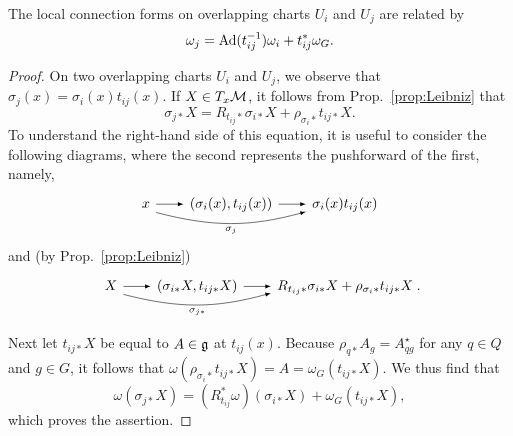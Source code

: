 \documentclass[
final,
11pt,
a4paper,
DIV=11,
headinclude=true,
footinclude=false,
bibliography=totoc,
twoside=true,  %
BCOR=5mm
]{scrbook}
\begin{document}
\begin{proposition}
\label{prop:trafo_local_Ehr_conn}
The local connection forms on overlapping charts $U_i$ and $U_j$ 
are related by
\begin{equation}
\label{eq:trafo_Ehr_conn}
  \omega_j = \operatorname{Ad}(t_{ij}^{-1}) \omega_i + t_{ij}^*\omega_G.
\end{equation}
\end{proposition}
\begin{proof}
On two overlapping charts $U_i$ and $U_j$, we observe that 
$\sigma_j(x) = \sigma_i(x) t_{ij}(x)$. If $X \in T_x\mathcal{M}$, it 
follows from Prop.~\ref{prop:Leibniz} that
\begin{equation*}
  \sigma_{j*}X = R_{t_{ij}*}\sigma_{i*}X + 
  \rho_{\sigma_i*}t_{ij*}X.
\end{equation*}
To understand the right-hand side of this equation, it is useful 
to consider the following diagrams, where the second represents 
the pushforward of the first, namely,
\begin{equation*}
\begin{tikzcd}[
  column sep=0.7cm,
  every arrow/.append style={-latex}
  ]
  x \arrow[r]
    \arrow[rr,
        "\sigma_j"',
        bend right=15,
        start anchor={[yshift=-4pt]},
        end anchor={[yshift=2pt]}]
  & (\sigma_i(x), t_{ij}(x)) \arrow[r]
  & \sigma_i(x) t_{ij}(x)
\end{tikzcd}
\end{equation*}
and (by Prop.~\ref{prop:Leibniz})
\begin{equation*}
\begin{tikzcd}[
  column sep=0.7cm,
  every arrow/.append style={-latex}
  ]
  X \arrow[r]
    \arrow[rr,
        "\sigma_{j*}"',
        bend right=15,
        start anchor={[yshift=-2.5pt]},
        end anchor={[yshift=+5pt]south west}]
  & (\sigma_{i*}X, t_{ij*}X) \arrow[r]
  & R_{t_{ij}*}\sigma_{i*}X + \rho_{\sigma_i*}t_{ij*}X
\end{tikzcd}
\!.
\end{equation*}

Next let $t_{ij*}X$ be equal to $A \in \mathfrak{g}$ at $t_{ij}(x)$.  
Because $\rho_{q*}A_g = A_{qg}^\star$ for any $q \in Q$ and $g 
\in G$, it follows that $\omega(\rho_{\sigma_i*} t_{ij*}X) 
= A = \omega_G(t_{ij*}X)$.  We thus find that
\begin{equation*}
  \omega(\sigma_{j*}X) = (R_{t_{ij}}^*\omega)(\sigma_{i*}X) + 
  \omega_G(t_{ij*}X),
\end{equation*}
which proves the assertion.
\end{proof}
\end{document}
